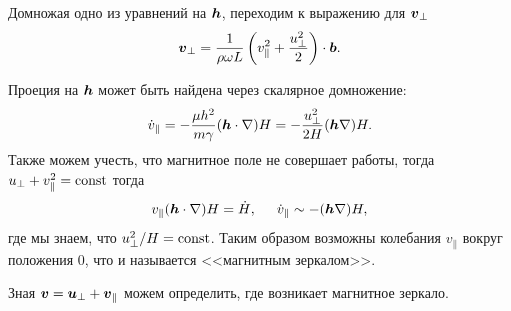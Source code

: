 Домножая одно из уравнений на $\mbox{\boldmath $h$}$, переходим к выражению для $\mbox{\boldmath $v$}_\bot$
\begin{equation*}
    \mbox{\boldmath $v$}_\bot = \frac{1}{\rho \omega L} \left(
        v_\parallel^2 + \frac{u_\bot^2}{2}
    \right) \cdot \mbox{\boldmath $b$}.
\end{equation*}



Проеция на $\mbox{\boldmath $h$}$ может быть найдена через скалярное домножение:
\begin{equation*}
    \dot{v}_\parallel = - \frac{\mu h^2}{m \gamma} (\mbox{\boldmath $h$} \cdot \nabla) H = - \frac{u_\bot^2}{2H} (\mbox{\boldmath $h$} \nabla) H.
\end{equation*}
Также можем учесть, что магнитное поле не совершает работы, тогда $u_\bot + v_\parallel^2 = \text{const}$ тогда
\begin{equation*}
    v_\parallel (\mbox{\boldmath $h$} \cdot \nabla) H = \dot{H},
    \hspace{5 mm} 
    \dot{v}_\parallel \sim - (\mbox{\boldmath $h$} \nabla) H,
\end{equation*}
где мы знаем, что $u_\bot^2/H = \text{const}$. Таким образом возможны колебания $v_\parallel$ вокруг положения 0, что и называется <<магнитным зеркалом>>. 


Зная $\mbox{\boldmath $v$} = \mbox{\boldmath $u$}_\bot + \mbox{\boldmath $v$}_\parallel$ можем определить, где возникает магнитное зеркало.


